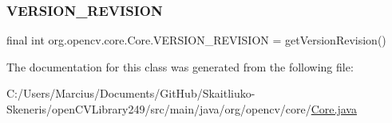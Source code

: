 \subsubsection{\texorpdfstring{V\+E\+R\+S\+I\+O\+N\+\_\+\+R\+E\+V\+I\+S\+I\+ON}{VERSION\_REVISION}}
{\footnotesize\ttfamily final int org.\+opencv.\+core.\+Core.\+V\+E\+R\+S\+I\+O\+N\+\_\+\+R\+E\+V\+I\+S\+I\+ON = get\+Version\+Revision()\hspace{0.3cm}{\ttfamily [static]}}



The documentation for this class was generated from the following file\+:\begin{DoxyCompactItemize}
\item 
C\+:/\+Users/\+Marcius/\+Documents/\+Git\+Hub/\+Skaitliuko-\/\+Skeneris/open\+C\+V\+Library249/src/main/java/org/opencv/core/\mbox{\hyperlink{_core_8java}{Core.\+java}}\end{DoxyCompactItemize}
